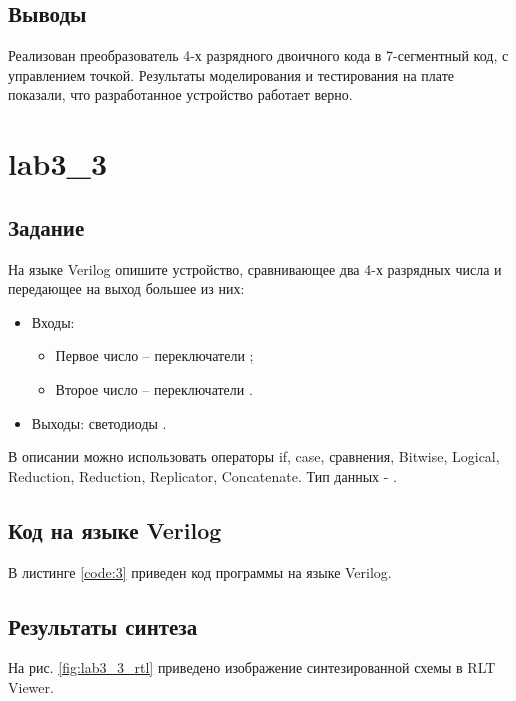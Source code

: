 \subsection{Выводы}

Реализован преобразователь 4-х разрядного двоичного кода в 7-сегментный код, с управлением точкой. Результаты моделирования и тестирования на плате показали, что разработанное устройство работает верно.

\section{lab3\_3}

\subsection{Задание}

На языке Verilog опишите устройство, сравнивающее два 4-х разрядных числа и передающее на выход большее из них:
\begin{itemize}
\item Входы:
	\begin{itemize}
		\item Первое число -- переключатели ;
		\item Второе число -- переключатели .
	\end{itemize}
\item Выходы: светодиоды .
\end{itemize}

В описании можно использовать операторы if, case, сравнения, Bitwise, Logical, Reduction, Reduction, Replicator, Concatenate. Тип данных - .

\subsection{Код на языке Verilog}

В листинге \ref{code:3} приведен код программы на языке Verilog.

%

\subsection{Результаты синтеза}

На рис. \ref{fig:lab3_3_rtl} приведено изображение синтезированной схемы в RLT Viewer.

